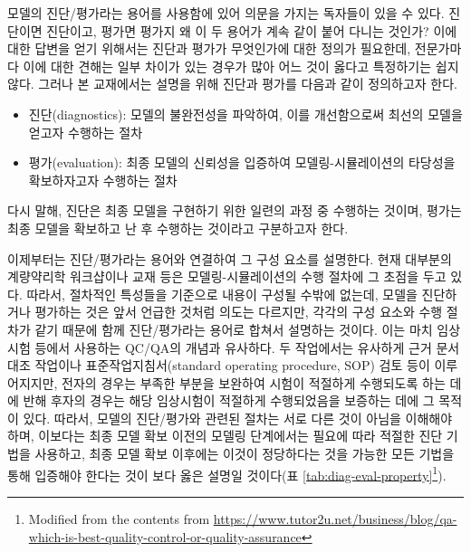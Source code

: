 \documentclass[
  11pt,
  krantz2,
  a4paper]{krantz}
\providecommand{\tightlist}{%
  \setlength{\itemsep}{0pt}\setlength{\parskip}{0pt}}
\theoremstyle{definition}
\theoremstyle{definition}
\theoremstyle{definition}
\theoremstyle{remark}
\begin{document}
모델의 진단/평가라는 용어를 사용함에 있어 의문을 가지는 독자들이 있을 수 있다. 진단이면 진단이고, 평가면 평가지 왜 이 두 용어가 계속 같이 붙어 다니는 것인가? 이에 대한 답변을 얻기 위해서는 진단과 평가가 무엇인가에 대한 정의가 필요한데, 전문가마다 이에 대한 견해는 일부 차이가 있는 경우가 많아 어느 것이 옳다고 특정하기는 쉽지 않다. 그러나 본 교재에서는 설명을 위해 진단과 평가를 다음과 같이 정의하고자 한다.

\begin{itemize}
\tightlist
\item
  진단(diagnostics): 모델의 불완전성을 파악하여, 이를 개선함으로써 최선의 모델을 얻고자 수행하는 절차
\item
  평가(evaluation): 최종 모델의 신뢰성을 입증하여 모델링-시뮬레이션의 타당성을 확보하자고자 수행하는 절차
\end{itemize}

다시 말해, 진단은 최종 모델을 구현하기 위한 일련의 과정 중 수행하는 것이며, 평가는 최종 모델을 확보하고 난 후 수행하는 것이라고 구분하고자 한다.

이제부터는 진단/평가라는 용어와 연결하여 그 구성 요소를 설명한다. 현재 대부분의 계량약리학 워크샵이나 교재 등은 모델링-시뮬레이션의 수행 절차에 그 초점을 두고 있다. 따라서, 절차적인 특성들을 기준으로 내용이 구성될 수밖에 없는데, 모델을 진단하거나 평가하는 것은 앞서 언급한 것처럼 의도는 다르지만, 각각의 구성 요소와 수행 절차가 같기 때문에 함께 진단/평가라는 용어로 합쳐서 설명하는 것이다. 이는 마치 임상시험 등에서 사용하는 QC/QA의 개념과 유사하다. 두 작업에서는 유사하게 근거 문서 대조 작업이나 표준작업지침서(standard operating procedure, SOP) 검토 등이 이루어지지만, 전자의 경우는 부족한 부분을 보완하여 시험이 적절하게 수행되도록 하는 데에 반해 후자의 경우는 해당 임상시험이 적절하게 수행되었음을 보증하는 데에 그 목적이 있다. 따라서, 모델의 진단/평가와 관련된 절차는 서로 다른 것이 아님을 이해해야 하며, 이보다는 최종 모델 확보 이전의 모델링 단계에서는 필요에 따라 적절한 진단 기법을 사용하고, 최종 모델 확보 이후에는 이것이 정당하다는 것을 가능한 모든 기법을 통해 입증해야 한다는 것이 보다 옳은 설명일 것이다(표 \ref{tab:diag-eval-property}\footnote{Modified from the contents from \url{https://www.tutor2u.net/business/blog/qa-which-is-best-quality-control-or-quality-assurance}}).

\end{document}
